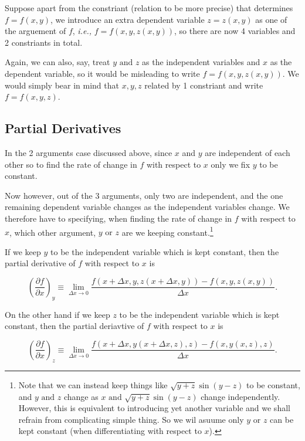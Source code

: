 \documentclass[english,a4paper,12pt]{report}
\begin{document}
Suppose apart from the constriant (relation to be more precise) that determines \(f = f(x,y)\), we introduce an extra dependent variable \(z = z(x,y)\) as one of the arguement of \(f\), \textit{i.e.,} \(f = f(x,y,z(x,y))\), so there are now 4 variables and 2 constriants in total. 

Again, we can also, say, treat \(y \text { and } z\) as the independent variables and \(x\) as the dependent variable, so it would be misleading to write \(f=f(x,y,z(x,y))\). We would simply bear in mind that \(x,y,z\) related by 1 constriant and write \(f=f(x,y,z)\). 

\subsection{Partial Derivatives}

In the 2 arguments case discussed above, since \(x\) and \(y\) are independent of each other so to find the rate of change in \(f\) with respect to \(x\) only we fix \(y\) to be constant.

Now however, out of the 3 arguments, only two are independent, and the one remaining dependent variable changes as the independent variables change. We therefore have to specifying, when finding the rate of change in \(f\) with respect to \(x\), which other argument, \(y \text { or } z\) are we keeping constant.\footnote{Note that we can instead keep things like \(\sqrt{y+z}\sin (y-z)\) to be constant, and \(y \text { and } z\) change as \(x \text { and } \sqrt{y+z}\sin (y-z)\) change independently. However, this is equivalent to introducing yet another variable and we shall refrain from complicating simple thing. So we wil asuume only \(y \text { or } z\) can be kept constant (when differentiating with respect to \(x\)).}   

If we keep \(y\) to be the independent variable which is kept constant, then the partial derivative of \(f\) with respect to \(x\) is

\begin{equation}
	\left( \frac{\partial f}{\partial x} \right)_{y} \equiv \lim_{\Delta x \to 0} \frac{f(x+\Delta x,y,z(x+\Delta x,y)) - f(x,y,z(x,y))}{\Delta x}. \label{useless} 
\end{equation}

On the other hand if we keep \(z\) to be the independent variable which is kept constant, then the partial deriavtive of \(f\) with respect to \(x\) is 

\begin{equation}
	\left( \frac{\partial f}{\partial x} \right)_{z} \equiv \lim_{\Delta x \to 0} \frac{f(x+\Delta x, y(x+\Delta x,z),z) - f(x,y(x,z),z)}{\Delta x}. 
\end{equation}
\end{document}
